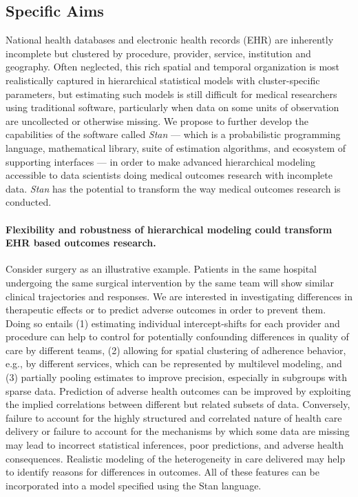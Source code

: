 \documentclass[11pt,notitlepage]{article}
\begin{document}
\subsection*{Specific Aims}

National health databases and electronic health records (EHR) are inherently incomplete but
clustered by procedure, provider, service, institution and geography. Often 
neglected, this rich spatial and temporal organization is most realistically 
captured in hierarchical statistical models with cluster-specific parameters, but 
estimating such models is still difficult for medical researchers using traditional software,
particularly when data on some units of observation are uncollected or otherwise missing.
We propose to further develop the capabilities of the software called \textit{Stan} --- 
which is a probabilistic programming language, mathematical library, suite of estimation
algorithms, and ecosystem of supporting interfaces --- in order to make advanced hierarchical  
modeling accessible to data scientists doing medical outcomes research with incomplete data.
\textit{Stan} has the potential to transform the way medical outcomes research is conducted.

\paragraph*{Flexibility and robustness of hierarchical modeling could 
transform EHR based outcomes research.} Consider surgery as an 
illustrative example. Patients in the same hospital undergoing the 
same surgical intervention by the same team will show similar clinical 
trajectories and responses. We are interested in investigating
differences in therapeutic effects or to predict adverse outcomes in order to prevent 
them. Doing so entails (1) estimating individual intercept-shifts for each provider and procedure
can help to control for potentially confounding differences 
in quality of care by different teams, (2) allowing for spatial clustering of adherence 
behavior, e.g., by different services, which can be represented by multilevel modeling, and
(3) partially pooling estimates to improve precision, especially in subgroups with sparse data.
Prediction of adverse health outcomes can be improved by exploiting the implied correlations between different but related subsets of data. 
Conversely, failure to account for the highly structured and correlated nature of health care delivery or
failure to account for the mechanisms by which some data are missing may lead 
to incorrect statistical inferences, poor predictions, and adverse health consequences. 
Realistic modeling of the heterogeneity in  care delivered may help to identify reasons for differences in outcomes.
All of these features can be incorporated into a model specified using the Stan language.
\end{document}
